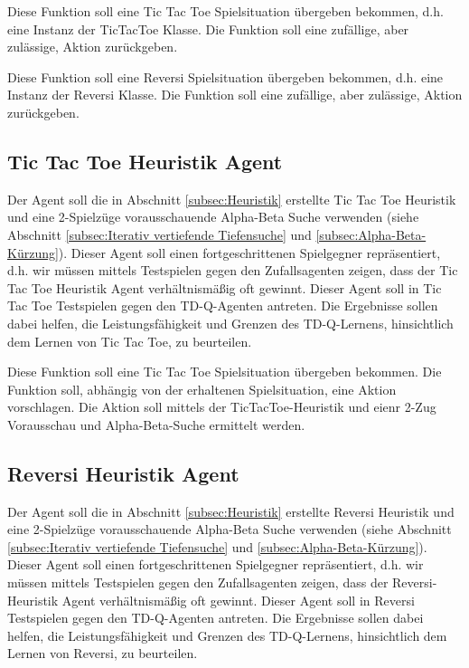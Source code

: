 Diese Funktion soll eine Tic Tac Toe Spielsituation übergeben bekommen, d.h. eine Instanz der TicTacToe Klasse. Die Funktion soll eine zufällige, aber zulässige, Aktion zurückgeben.

Diese Funktion soll eine Reversi Spielsituation übergeben bekommen, d.h. eine Instanz der Reversi Klasse. Die Funktion soll eine zufällige, aber zulässige, Aktion zurückgeben.

\subsection{Tic Tac Toe Heuristik Agent}
Der Agent soll die in Abschnitt \ref{subsec:Heuristik} erstellte Tic Tac Toe Heuristik und eine 2-Spielzüge vorausschauende Alpha-Beta Suche verwenden (siehe Abschnitt \ref{subsec:Iterativ vertiefende Tiefensuche} und \ref{subsec:Alpha-Beta-Kürzung}). Dieser Agent soll einen fortgeschrittenen Spielgegner repräsentiert, d.h. wir müssen mittels Testspielen gegen den Zufallsagenten zeigen, dass der Tic Tac Toe Heuristik Agent verhältnismäßig oft gewinnt. Dieser Agent soll in Tic Tac Toe Testspielen gegen den TD-Q-Agenten antreten. Die Ergebnisse sollen dabei helfen, die Leistungsfähigkeit und Grenzen des TD-Q-Lernens, hinsichtlich dem Lernen von Tic Tac Toe, zu beurteilen. 

Diese Funktion soll eine Tic Tac Toe Spielsituation übergeben bekommen. Die Funktion soll, abhängig von der erhaltenen Spielsituation, eine Aktion vorschlagen. Die Aktion soll mittels der TicTacToe-Heuristik und eienr 2-Zug Vorausschau und Alpha-Beta-Suche ermittelt werden.

\subsection{Reversi Heuristik Agent}
Der Agent soll die in Abschnitt \ref{subsec:Heuristik} erstellte Reversi Heuristik und eine 2-Spielzüge vorausschauende Alpha-Beta Suche verwenden (siehe Abschnitt \ref{subsec:Iterativ vertiefende Tiefensuche} und \ref{subsec:Alpha-Beta-Kürzung}). Dieser Agent soll einen fortgeschrittenen Spielgegner repräsentiert, d.h. wir müssen mittels Testspielen gegen den Zufallsagenten zeigen, dass der Reversi-Heuristik Agent verhältnismäßig oft gewinnt. Dieser Agent soll in Reversi Testspielen gegen den TD-Q-Agenten antreten. Die Ergebnisse sollen dabei helfen, die Leistungsfähigkeit und Grenzen des TD-Q-Lernens, hinsichtlich dem Lernen von Reversi, zu beurteilen.

